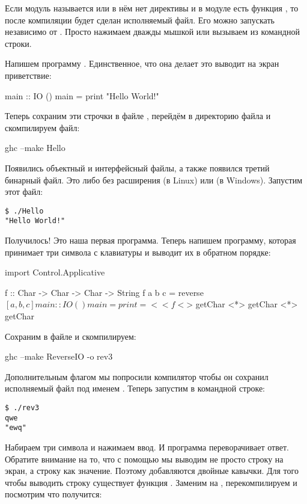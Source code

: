 Если модуль называется  или в нём нет директивы
 и в модуле есть функция , то
после компиляции будет сделан исполняемый файл. Его можно запускать
независимо от . Просто нажимаем дважды мышкой или вызываем из
командной строки.

Напишем программу . Единственное, что она делает это
выводит на экран приветствие:


\begin{code}
main :: IO ()
main = print "Hello World!" 
\end{code}

Теперь сохраним эти строчки в файле , перейдём в директорию
файла и скомпилируем файл:


\begin{code}
ghc --make Hello
\end{code}

Появились объектный и интерфейсный файлы, а также появился третий
бинарный файл. Это либо  без расширения (в Linux) или
 (в Windows). Запустим этот файл:


\begin{verbatim}
$ ./Hello
"Hello World!"
\end{verbatim}

Получилось! Это наша первая программа. Теперь напишем программу, которая
принимает три символа с клавиатуры и выводит их в обратном порядке:


\begin{code}
import Control.Applicative

f :: Char -> Char -> Char -> String
f a b c = reverse $ [a,b,c]

main :: IO ()
main = print =<< f <$> getChar <*> getChar <*> getChar
\end{code}

Сохраним в файле  и скомпилируем:


\begin{code}
ghc --make ReverseIO -o rev3
\end{code}

Дополнительным флагом  мы попросили компилятор чтобы он сохранил
исполняемый файл под именем . Теперь запустим в командной
строке:


\begin{verbatim}
$ ./rev3
qwe
"ewq"
\end{verbatim}

Набираем три символа и нажимаем ввод. И программа переворачивает ответ.
Обратите внимание на то, что с помощью  мы выводим не просто
строку на экран, а строку как значение. Поэтому добавляются двойные
кавычки. Для того чтобы выводить строку существует функция .
Заменим  на , перекомпилируем и посмотрим что
получится:


